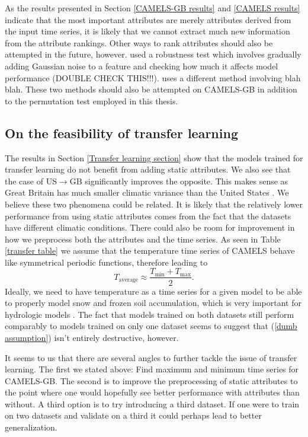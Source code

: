 As the results presented in Section \ref{CAMELS-GB results} and \ref{CAMELS results} 
indicate that the most important attributes are merely attributes derived from the 
input time series, it is likely that we cannot extract much new information from 
the attribute rankings. Other ways to rank attributes should also be attempted 
in the future, however. \citet{lstm_second_paper} used a robustness test which 
involves gradually adding Gaussian noise to a feature and checking how much it 
affects model performance (DOUBLE CHECK THIS!!!). \citet{OrigCAMELSRanking} 
uses a different method involving blah blah. These two methods should also be 
attempted on CAMELS-GB in addition to the permutation test employed in this 
thesis.



\subsection{On the feasibility of transfer learning}
The results in Section \ref{Transfer learning section} show that the models trained 
for transfer learning do not benefit from adding static attributes. We also see 
that the case of US$\rightarrow$GB significantly improves the opposite. This makes 
sense as Great Britain has much smaller climatic variance than the United States 
\citationneeded. We believe these two phenomena could be related. It is likely 
that the relatively lower performance from using static attributes comes from the 
fact that the datasets have different climatic conditions. There could also be 
room for improvement in how we preprocess both the attributes and the time series. 
As seen in Table \ref{transfer table} we assume that the temperature time series 
of CAMELS behave like symmetrical periodic functions, therefore leading to 
\begin{equation}
T_\text{average} \approx  \frac{T_\text{min}+T_\text{max}}{2}. \label{dumb assumption}
\end{equation}
Ideally, we need to have temperature as a time series for a given model to be able 
to properly model snow and frozen soil accumulation, which is very important for 
hydrologic models \citationneeded. The fact that models trained on both datasets 
still perform comparably to models trained on only one dataset seems to suggest 
that (\ref{dumb assumption}) isn't entirely destructive, however.

It seems to us that there are several angles to further tackle the issue of transfer 
learning. The first we stated above: Find maximum and minimum time series for 
CAMELS-GB. The second is to improve the preprocessing of static attributes to 
the point where one would hopefully see better performance with attributes than 
without. A third option is to try introducing a third dataset. If one were to 
train on two datasets and validate on a third it could perhaps lead to better 
generalization. 
